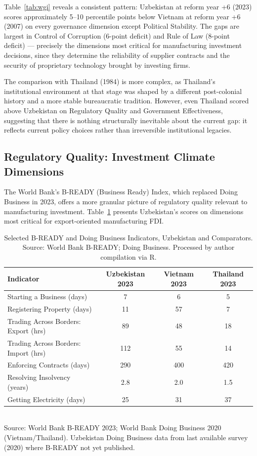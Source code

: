 Table~\ref{tab:wgi} reveals a consistent pattern: Uzbekistan at reform year +6 (2023) scores approximately 5--10 percentile points below Vietnam at reform year +6 (2007) on every governance dimension except Political Stability. The gaps are largest in Control of Corruption (6-point deficit) and Rule of Law (8-point deficit) --- precisely the dimensions most critical for manufacturing investment decisions, since they determine the reliability of supplier contracts and the security of proprietary technology brought by investing firms.

The comparison with Thailand (1984) is more complex, as Thailand's institutional environment at that stage was shaped by a different post-colonial history and a more stable bureaucratic tradition. However, even Thailand scored above Uzbekistan on Regulatory Quality and Government Effectiveness, suggesting that there is nothing structurally inevitable about the current gap: it reflects current policy choices rather than irreversible institutional legacies.

\subsection{Regulatory Quality: Investment Climate Dimensions}

The World Bank's B-READY (Business Ready) Index, which replaced Doing Business in 2023, offers a more granular picture of regulatory quality relevant to manufacturing investment. Table~\ref{tab:bready} presents Uzbekistan's scores on dimensions most critical for export-oriented manufacturing FDI.

\begin{table}[H]
 \centering
 \caption{Selected B-READY and Doing Business Indicators, Uzbekistan and Comparators. Source: World Bank B-READY; Doing Business. Processed by author compilation via R.}
 \label{tab:bready}
 \small
 \begin{tabular}{@{}lccc@{}}
 \toprule
 Indicator & Uzbekistan 2023 & Vietnam 2023 & Thailand 2023 \\
 \midrule
 Starting a Business (days) & 7 & 6 & 5 \\
 Registering Property (days) & 11 & 57 & 7 \\
 Trading Across Borders: Export (hrs) & 89 & 48 & 18 \\
 Trading Across Borders: Import (hrs) & 112 & 55 & 14 \\
 Enforcing Contracts (days) & 290 & 400 & 420 \\
 Resolving Insolvency (years) & 2.8 & 2.0 & 1.5 \\
 Getting Electricity (days) & 25 & 31 & 37 \\
 \bottomrule
 \end{tabular}
 \\\smallskip
 \small Source: World Bank B-READY 2023; World Bank Doing Business 2020 (Vietnam/Thailand). Uzbekistan Doing Business data from last available survey (2020) where B-READY not yet published.
\end{table}

